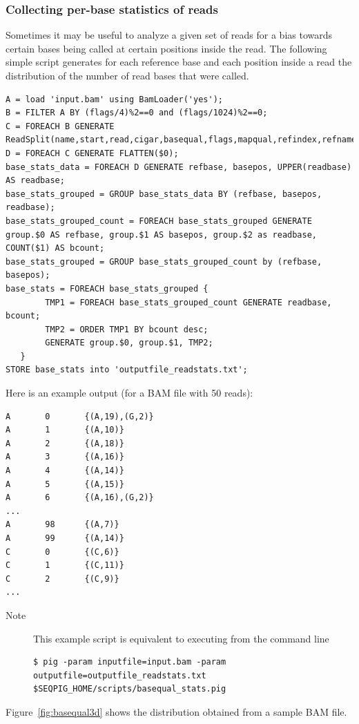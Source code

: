 \subsubsection{Collecting per-base statistics of reads}
Sometimes it may be useful to analyze a given set of reads for a bias
towards certain bases being called at certain positions inside the
read. The following simple script generates for each reference base and
each position inside a read the distribution of the number of read bases
that were called.
\begin{lstlisting}
A = load 'input.bam' using BamLoader('yes');
B = FILTER A BY (flags/4)%2==0 and (flags/1024)%2==0;
C = FOREACH B GENERATE ReadSplit(name,start,read,cigar,basequal,flags,mapqual,refindex,refname,attributes#'MD');
D = FOREACH C GENERATE FLATTEN($0);
base_stats_data = FOREACH D GENERATE refbase, basepos, UPPER(readbase) AS readbase;
base_stats_grouped = GROUP base_stats_data BY (refbase, basepos, readbase);
base_stats_grouped_count = FOREACH base_stats_grouped GENERATE group.$0 AS refbase, group.$1 AS basepos, group.$2 as readbase, COUNT($1) AS bcount;
base_stats_grouped = GROUP base_stats_grouped_count by (refbase, basepos);
base_stats = FOREACH base_stats_grouped {
        TMP1 = FOREACH base_stats_grouped_count GENERATE readbase, bcount;
        TMP2 = ORDER TMP1 BY bcount desc;
        GENERATE group.$0, group.$1, TMP2;
   }
STORE base_stats into 'outputfile_readstats.txt';
\end{lstlisting}
Here is an example output (for a BAM file with 50 reads):
\begin{lstlisting}
A       0       {(A,19),(G,2)}
A       1       {(A,10)}
A       2       {(A,18)}
A       3       {(A,16)}
A       4       {(A,14)}
A       5       {(A,15)}
A       6       {(A,16),(G,2)}
...
A       98      {(A,7)}
A       99      {(A,14)}
C       0       {(C,6)}
C       1       {(C,11)}
C       2       {(C,9)}
...
\end{lstlisting}
\begin{description}
	\item[Note] This example script is equivalent to executing from the command line
\begin{lstlisting}
$ pig -param inputfile=input.bam -param outputfile=outputfile_readstats.txt $SEQPIG_HOME/scripts/basequal_stats.pig
\end{lstlisting}
\end{description}
Figure~\ref{fig:basequal3d} shows the distribution obtained from a sample BAM file.

